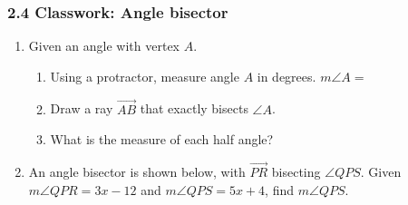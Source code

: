 

\fancyhead[LE]{\thepage}



\subsubsection*{2.4 Classwork: Angle bisector}
\begin{enumerate}
\item Given an angle with vertex $A$.
  \begin{enumerate}[itemsep=0.5cm]
    \item Using a protractor, measure angle $A$ in degrees. $m\angle A =$
    \item Draw a ray $\overrightarrow{AB}$ that exactly bisects $\angle A$.
    \item What is the measure of each half angle?
  \end{enumerate}
  \begin{center}
  \end{center}


\item An angle bisector is shown below, with $\overrightarrow{PR}$ bisecting $\angle QPS$. Given $m\angle QPR = 3x-12$ and $m\angle QPS = 5x+4$, find $m\angle QPS$.
  \begin{flushright}
  \end{flushright}


\end{enumerate}
